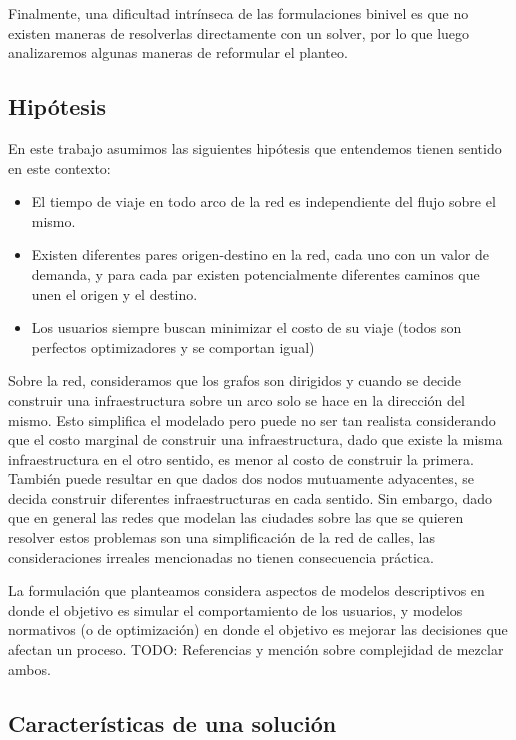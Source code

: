 \documentclass{article}
\begin{document}
  Finalmente, una dificultad intrínseca de las formulaciones binivel es que no existen maneras de resolverlas directamente con un solver, por lo que luego analizaremos algunas maneras de reformular el planteo.

  \subsection{Hipótesis}

  En este trabajo asumimos las siguientes hipótesis que entendemos tienen sentido en este contexto:

  \begin{itemize}
    \item{El tiempo de viaje en todo arco de la red es independiente del flujo sobre el mismo.}
    \item{Existen diferentes pares origen-destino en la red, cada uno con un valor de demanda, y para cada par existen potencialmente diferentes caminos que unen el origen y el destino.}
    \item{Los usuarios siempre buscan minimizar el costo de su viaje (todos son
    perfectos optimizadores y se comportan igual)}
  \end{itemize}

  Sobre la red, consideramos que los grafos son dirigidos y cuando se decide construir una infraestructura sobre un arco solo se hace en la dirección del mismo. Esto simplifica el modelado pero puede no ser tan realista considerando que el costo marginal de construir una infraestructura, dado que existe la misma infraestructura en el otro sentido, es menor al costo de construir la primera. También puede resultar en que dados dos nodos mutuamente adyacentes, se decida construir diferentes infraestructuras en cada sentido. Sin embargo, dado que en general las redes que modelan las ciudades sobre las que se quieren resolver estos problemas son una simplificación de la red de calles, las consideraciones irreales mencionadas no tienen consecuencia práctica.

  La formulación que planteamos considera aspectos de modelos descriptivos en donde el objetivo es simular el comportamiento de los usuarios, y modelos normativos (o de optimización) en donde el objetivo es mejorar las decisiones que afectan un proceso. TODO: Referencias y mención sobre complejidad de mezclar ambos.

  \subsection{Características de una solución}
\end{document}
